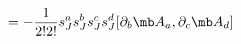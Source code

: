 \begin{equation}
[L_3^{(2)},L_1^{(2)}]=- \frac{1}{2!2!} s_{J}^{a}s_{J}^{b} s_{J}^{c}s_{J}^{d}[\partial_b{\mb A}_a,\partial_c{\mb A}_d]
\end{equation}

